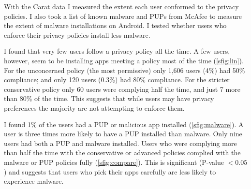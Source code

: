 \documentclass[a4paper]{scrartcl}
\begin{document}
With the Carat data I measured the extent each user conformed to the privacy policies.
I also took a list of known malware and \acp{PUP} from McAfee to measure the extent of malware installations on Android.
I tested whether users who enforce their privacy policies install less malware.

I found that very few users follow a privacy policy all the time.
A few users, however, seem to be installing apps meeting a policy most of the time (\autoref{sfig:lin}).
For the unconcerned policy (the most permissive) only 1,606 users (4\%) had 50\% compliance;
and only 120 users (0.3\%) had 80\% compliance.
For the stricter conservative policy only 60 users were complying half the time, and just 7 more than 80\% of the time.
This suggests that while users may have privacy preferences the majority are not attempting to enforce them.

I found 1\% of the users had a PUP or malicious app installed (\autoref{sfig:malware}).
A user is three times more likely to have a PUP installed than malware.
Only nine users had both a PUP and malware installed.
Users who were complying more than half the time with the conservative or advanced policies complied with the malware or PUP policies fully (\autoref{sfig:compare}).
This is significant (P-value $< 0.05$) and suggests that users who pick their apps carefully are less likely to experience malware.
\end{document}
